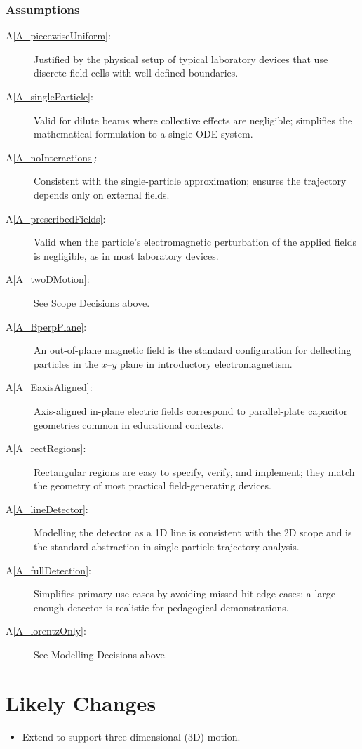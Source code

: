 \documentclass[12pt]{article}
\newcommand{\aref}[1]{A\ref{#1}}
\newcounter{lcnum} %
\begin{document}
\subsubsection*{Assumptions}
\begin{description}
\item[\aref{A_piecewiseUniform}:] Justified by the physical setup of typical laboratory
  devices that use discrete field cells with well-defined boundaries.
\item[\aref{A_singleParticle}:] Valid for dilute beams where collective effects are
  negligible; simplifies the mathematical formulation to a single ODE system.
\item[\aref{A_noInteractions}:] Consistent with the single-particle approximation;
  ensures the trajectory depends only on external fields.
\item[\aref{A_prescribedFields}:] Valid when the particle's electromagnetic perturbation
  of the applied fields is negligible, as in most laboratory devices.
\item[\aref{A_twoDMotion}:] See Scope Decisions above.
\item[\aref{A_BperpPlane}:] An out-of-plane magnetic field is the standard configuration
  for deflecting particles in the $x$--$y$ plane in introductory electromagnetism.
\item[\aref{A_EaxisAligned}:] Axis-aligned in-plane electric fields correspond to
  parallel-plate capacitor geometries common in educational contexts.
\item[\aref{A_rectRegions}:] Rectangular regions are easy to specify, verify, and
  implement; they match the geometry of most practical field-generating devices.
\item[\aref{A_lineDetector}:] Modelling the detector as a 1D line is consistent with
  the 2D scope and is the standard abstraction in single-particle trajectory analysis.
\item[\aref{A_fullDetection}:] Simplifies primary use cases by avoiding missed-hit
  edge cases; a large enough detector is realistic for pedagogical demonstrations.
\item[\aref{A_lorentzOnly}:] See Modelling Decisions above.
\end{description}

\section{Likely Changes}    

\noindent \begin{itemize}

\item[LC\refstepcounter{lcnum}\thelcnum\label{LC_3D}:] Extend \progname{} to support three-dimensional (3D) motion.

\end{itemize}
\end{document}
